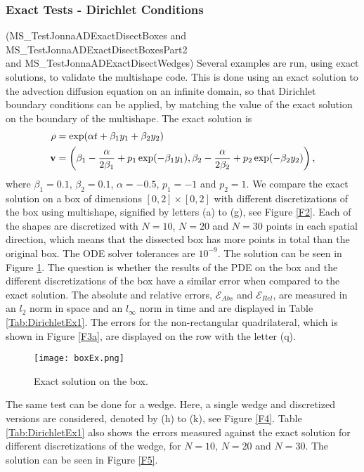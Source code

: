 \subsubsection*{Exact Tests - Dirichlet Conditions}
(MS\_TestJonnaADExactDisectBoxes and MS\_TestJonnaADExactDisectBoxesPart2\\ and MS\_TestJonnaADExactDisectWedges)
Several examples are run, using exact solutions, to validate the multishape code. This is done using an exact solution to the advection diffusion equation on an infinite domain, so that Dirichlet boundary conditions can be applied, by matching the value of the exact solution on the boundary of the multishape.
The exact solution is \cite{Hutomo_2019}
\begin{align}\label{eq:DirichletExactSol}
	\rho &= \exp(\alpha t + \beta_1 y_1 + \beta_2 y_2)\\
	\mathbf v &= \left(\beta_1 - \frac{\alpha}{2 \beta_1} + p_1\exp(-\beta_1 y_1) , \beta_2 - \frac{\alpha}{2 \beta_2} + p_2\exp(-\beta_2 y_2) \right),\notag
\end{align}
where $\beta_1 = 0.1$, $\beta_2 = 0.1$, $\alpha = -0.5$, $p_1 = -1$ and $p_2 = 1$.
We compare the exact solution on a box of dimensions $[0,2] \times [0,2] $ with different discretizations of the box using multishape, signified by letters (a) to (g), see Figure \ref{F2}. Each of the shapes are discretized with $N = 10$, $N = 20$ and $N = 30$ points in each spatial direction, which means that the dissected box has more points in total than the original box. The ODE solver tolerances are $10^{-9}$. The solution can be seen in Figure \ref{F3}. The question is whether the results of the PDE on the box and the different discretizations of the box have a similar error when compared to the exact solution. The absolute and relative errors, $\mathcal E_{Abs}$ and $\mathcal E_{Rel}$, are measured in an $l_2$ norm in space and an $l_\infty$ norm in time and are displayed in Table \ref{Tab:DirichletEx1}. The errors for the non-rectangular quadrilateral, which is shown in Figure \ref{F3a}, are displayed on the row with the letter (q). 


	\begin{figure}[h]
		\centering
		\texttt{[image: boxEx.png]}
		\caption{Exact solution on the box.} 
		\label{F3}
	\end{figure}


The same test can be done for a wedge. Here, a single wedge and discretized versions are considered, denoted by (h) to (k), see Figure \ref{F4}. Table \ref{Tab:DirichletEx1} also shows the errors measured against the exact solution for different discretizations of the wedge, for $N = 10$, $N = 20$ and $N = 30$. The solution can be seen in Figure \ref{F5}.



